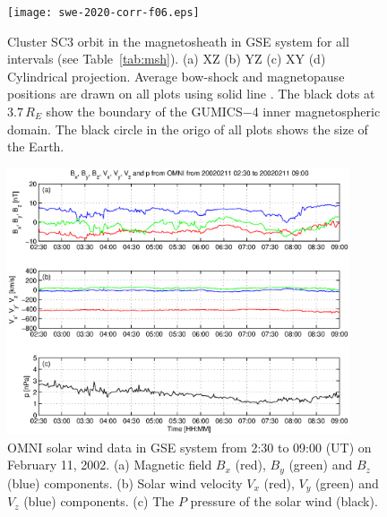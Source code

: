 \documentclass[linenumbers,draft]{agujournal}
\begin{document}
\pagebreak

\begin{figure}[h]
\centering
\texttt{[image: swe-2020-corr-f06.eps]}  
\caption{Cluster SC3 orbit in the magnetosheath in GSE system for all intervals (see Table~\ref{tab:msh}). (a) XZ (b) YZ (c) XY (d) Cylindrical projection. Average bow-shock and magnetopause positions are drawn on all plots using solid line \citep[][respectively]{peredo95:_three_alfven_mach,tsyganenko95:_model_earth}. The black dots at $3.7\,R_E$ show the boundary of the GUMICS$-$4 inner magnetospheric domain. The black circle in the origo of all plots shows the size of the Earth.}
\label{fig:mshorbit}
\end{figure}

\pagebreak

\begin{figure}[h]
\centering
\includegraphics[width=0.9\textwidth,angle=0]{swe-2020-corr-f07.eps}  
\caption{OMNI solar wind data in GSE system from 2:30 to 09:00 (UT) on February 11, 2002. (a) Magnetic field $B_{x}$ (red), $B_{y}$ (green) and $B_{z}$ (blue) components. (b) Solar wind velocity $V_{x}$ (red), $V_{y}$ (green) and $V_{z}$ (blue) components. (c) The $P$ pressure of the solar wind (black).}
\label{fig:mshomni}
\end{figure}

\pagebreak
\end{document}
